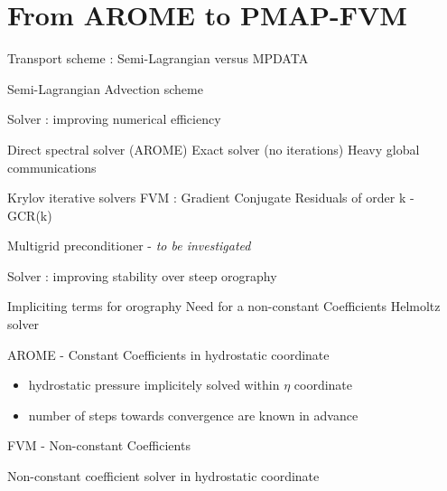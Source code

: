 \documentclass{beamer}
\begin{document}
\section{From AROME to PMAP-FVM}

\begin{frame}{Transport scheme : Semi-Lagrangian versus MPDATA}

    \begin{block}{Semi-Lagrangian Advection scheme}
    \end{block}
\end{frame}

\begin{frame}{Solver : improving numerical efficiency}
    
    \begin{block}{Direct spectral solver (AROME)}
        \textcolor{blue}{} Exact solver (no iterations) \newline 
        \textcolor{red}{} Heavy global communications
    \end{block}

    \begin{block}{Krylov iterative solvers}
        FVM : Gradient Conjugate Residuals of order k - GCR(k)  \newline
        \textcolor{blue}{} \newline 
        \textcolor{red}{} 
    \end{block}

    \begin{alertblock}{Multigrid preconditioner - \textit{to be investigated}}
    \end{alertblock}
\end{frame}



\begin{frame}{Solver : improving stability over steep orography}
    \begin{block}{Impliciting terms for orography}
        Need for a non-constant Coefficients Helmoltz solver
    \end{block}

    \begin{block}{AROME - Constant Coefficients in hydrostatic coordinate}
        \begin{itemize}
            \item hydrostatic pressure implicitely solved within $\eta$ coordinate
            \item number of steps towards convergence are known in advance
        \end{itemize}

    \end{block}

    \begin{block}{FVM - Non-constant Coefficients}
        
    \end{block}

    \begin{alertblock}{Non-constant coefficient solver in hydrostatic coordinate}
    \end{alertblock}
\end{frame}
\end{document}
